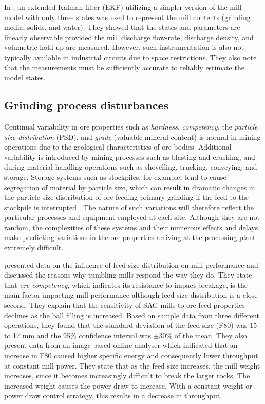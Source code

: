 In \cite{le_roux_ekf_2017}, an extended Kalman filter (EKF) utilizing a simpler version of the mill model with only three states was used to represent the mill contents (grinding media, solids, and water). They showed that the states and parameters are linearly observable provided the mill discharge flow-rate, discharge density, and volumetric hold-up are measured. However, such instrumentation is also not typically available in industrial circuits due to space restrictions. They also note that the measurements must be sufficiently accurate to reliably estimate the model states.

\subsection{Grinding process disturbances}

Continual variability in ore properties such as \textit{hardness}, \textit{competency}, the \textit{particle size distribution} (PSD), and \textit{grade} (valuable mineral content) is normal in mining operations due to the geological characteristics of ore bodies. Additional variability is introduced by mining processes such as blasting and crushing, and during material handling operations such as shovelling, trucking, conveying, and storage. Storage systems such as stockpiles, for example, tend to cause segregation of material by particle size, which can result in dramatic changes in the particle size distribution of ore feeding primary grinding if the feed to the stockpile is interrupted \citep{estrada_hybrid_2014}. The nature of such variations will therefore reflect the particular processes and equipment employed at each site. Although they are not random, the complexities of these systems and their numerous effects and delays make predicting variations in the ore properties arriving at the processing plant extremely difficult.

\cite{morrell_influence_2001} presented data on the influence of feed size distribution on mill performance and discussed the reasons why tumbling mills respond the way they do. They state that \textit{ore competency}, which indicates its resistance to impact breakage, is the main factor impacting mill performance although feed size distribution is a close second. They explain that the sensitivity of \gls{SAG} mills to ore feed properties declines as the ball filling is increased. Based on sample data from three different operations, they found that the standard deviation of the feed size (F80) was 15 to 17 mm and the 95\% confidence interval was $\pm30\text{\%}$ of the mean. They also present data from an image-based online analyser which indicated that an increase in F80 caused higher specific energy and consequently lower throughput at constant mill power. They state that as the feed size increases, the mill weight increases, since it becomes increasingly difficult to break the larger rocks. The increased weight causes the power draw to increase. With a constant weight or power draw control strategy, this results in a decrease in throughput.

